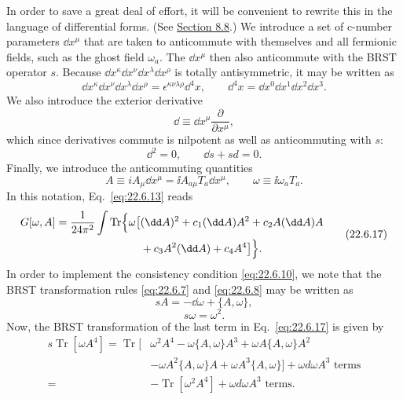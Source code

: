 In order to save a great deal of effort, it will be convenient to rewrite
this in the language of differential forms. (See
\hyperref[sec:8.8]{Section 8.8}.) We introduce a set of c-number parameters
$\dd x^\mu$ that are taken to anticommute with themselves and all fermionic
fields, such as the ghost field $\omega_a$. The $\dd x^\mu$ then also
anticommute with the BRST operator $s$. Because
$\dd x^\kappa \dd x^\nu \dd x^\lambda \dd x^\rho$ is totally antisymmetric, it may be
written as
\begin{equation}
 \dd x^\kappa \dd x^\nu \dd x^\lambda \dd x^\rho
 =\epsilon^{\kappa\nu\lambda\rho}\dd^4x,
 \qquad
 \dd^4x=\dd x^0\dd x^1\dd x^2\dd x^3.
 \tag{22.6.14}\label{eq:22.6.14}
\end{equation}
We also introduce the exterior derivative
\[
 \dd\equiv \dd x^\mu\frac{\partial}{\partial x^\mu},
\]
which since derivatives commute is nilpotent as well as anticommuting
with $s$:
\begin{equation}
 \dd^2=0,
 \qquad
 \dd s+sd=0.
 \tag{22.6.15}\label{eq:22.6.15}
\end{equation}
Finally, we introduce the anticommuting quantities
\begin{equation}
 A\equiv iA_\mu \dd x^\mu
 =\ii A_{a\mu}T_a \dd x^\mu,
 \qquad
 \omega\equiv \ii\omega_a T_a.
 \tag{22.6.16}\label{eq:22.6.16}
\end{equation}
In this notation, Eq.~\eqref{eq:22.6.13} reads
\begin{equation}
 \begin{aligned}
 G[\omega,A]
 =\frac{1}{24\pi^2}\int\operatorname{Tr}\Bigl\{
 \omega\bigl[
 &(\dd A)^2+c_1(\dd A)A^2+c_2A(\dd A)A
 \\
 &+c_3A^2(\dd A)+c_4A^4
 \bigr]\Bigr\}.
 \end{aligned}
 \tag{22.6.17}\label{eq:22.6.17}
\end{equation}
In order to implement the consistency condition \eqref{eq:22.6.10}, we
note that the BRST transformation rules \eqref{eq:22.6.7} and
\eqref{eq:22.6.8} may be written as
\begin{equation}
 sA=-\dd\omega+\{A,\omega\},
 \tag{22.6.18}\label{eq:22.6.18}
\end{equation}
\begin{equation}
 s\omega=\omega^2.
 \tag{22.6.19}\label{eq:22.6.19}
\end{equation}
Now, the BRST transformation of the last term in Eq.~\eqref{eq:22.6.17}
is given by
\[
 \begin{aligned}
 s\operatorname{Tr}[\omega A^4]
 =\operatorname{Tr}\bigl[
 &\omega^2A^4-\omega\{A,\omega\}A^3
 +\omega A\{A,\omega\}A^2
 \\
 &-\omega A^2\{A,\omega\}A
 +\omega A^3\{A,\omega\}
 \bigr]
 +\text{$\omega d\omega A^3$ terms}
 \\
 ={}&-\operatorname{Tr}[\omega^2A^4]
 +\text{$\omega d\omega A^3$ terms}.
 \end{aligned}
\]
